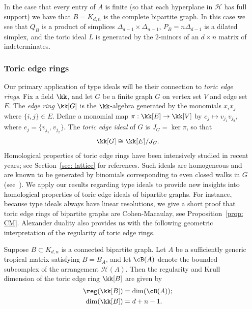 In the case that every entry of $A$ is finite (so that each hyperplane in ${\mathcal H}$ has full support) we have that $B = K_{d,n}$ is the complete bipartite graph.  In this case we see that $Q_B$ is a product of simplices $\Delta_{d-1} \times \Delta_{n-1}$, $P_B = n \Delta_{d-1}$ is a dilated simplex, and the toric ideal $L$ is generated by the $2$-minors of an $d \times n$ matrix of indeterminates. 

\subsubsection{Toric edge rings}
Our primary application of type ideals will be their connection to \emph{toric edge rings}.  Fix a field $\kk$, and let $G$ be a finite graph $G$ on vertex set $V$ and edge set $E$. The \emph{edge ring} $\kk[G]$ is the $\kk$-algebra generated by the monomials $x_ix_j$ where $\{i,j\} \in E$. Define a monomial map $\pi:\kk[E] \rightarrow \kk[V]$ by $e_j \mapsto v_{j_1}v_{j_2}$, where $e_j = \{v_{j_1}, v_{j_2}\}$. The \emph{toric edge ideal} of $G$ is $J_G = \ker \pi$, so that 
\[\kk[G] \cong \kk[E]/J_G.\] 
\noindent
Homological properties of toric edge rings have been intensively studied in recent years; see Section~\ref{sec: lattice} for references.  Such ideals are homogeneous and are known to be generated by binomials corresponding to even closed walks in $G$ (see~\cite{villarreal1995rees}). 
We apply our results regarding type ideals to provide new insights into homological properties of toric edge ideals of bipartite graphs. For instance, because type ideals always have linear resolutions, we give a short proof that toric edge rings of bipartite graphs are Cohen-Macaulay, see Proposition~\ref{prop: CM}. Alexander duality also provides us with the following geometric interpretation of the regularity of toric edge rings.



\begin{thm} \label{thm: regdim}
Suppose $B \subset K_{d,n}$ is a connected bipartite graph. Let $A$ be a sufficiently generic tropical matrix satisfying $B = B_A$, and let $\cB(A)$ denote the bounded subcomplex of the arrangement  ${\mathcal H}(A)$. Then the regularity and Krull dimension of the toric edge ring ${\kk}[B]$ are given by
\begin{equation}
\begin{split}
\reg({\kk}[B]) &= \dim(\cB(A)); \\
\dim({\kk}[B]) &= d+n-1.
\end{split}
\end{equation}
\end{thm}

